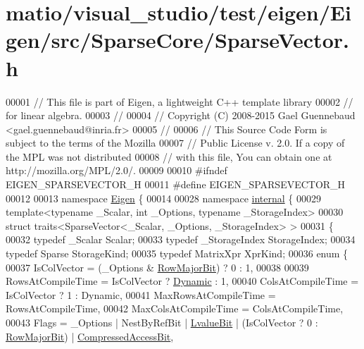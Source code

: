 \hypertarget{matio_2visual__studio_2test_2eigen_2_eigen_2src_2_sparse_core_2_sparse_vector_8h_source}{}\section{matio/visual\+\_\+studio/test/eigen/\+Eigen/src/\+Sparse\+Core/\+Sparse\+Vector.h}
\label{matio_2visual__studio_2test_2eigen_2_eigen_2src_2_sparse_core_2_sparse_vector_8h_source}

\begin{DoxyCode}
00001 \textcolor{comment}{// This file is part of Eigen, a lightweight C++ template library}
00002 \textcolor{comment}{// for linear algebra.}
00003 \textcolor{comment}{//}
00004 \textcolor{comment}{// Copyright (C) 2008-2015 Gael Guennebaud <gael.guennebaud@inria.fr>}
00005 \textcolor{comment}{//}
00006 \textcolor{comment}{// This Source Code Form is subject to the terms of the Mozilla}
00007 \textcolor{comment}{// Public License v. 2.0. If a copy of the MPL was not distributed}
00008 \textcolor{comment}{// with this file, You can obtain one at http://mozilla.org/MPL/2.0/.}
00009 
00010 \textcolor{preprocessor}{#ifndef EIGEN\_SPARSEVECTOR\_H}
00011 \textcolor{preprocessor}{#define EIGEN\_SPARSEVECTOR\_H}
00012 
00013 \textcolor{keyword}{namespace }\hyperlink{namespace_eigen}{Eigen} \{ 
00014 
00028 \textcolor{keyword}{namespace }\hyperlink{namespaceinternal}{internal} \{
00029 \textcolor{keyword}{template}<\textcolor{keyword}{typename} \_Scalar, \textcolor{keywordtype}{int} \_Options, \textcolor{keyword}{typename} \_StorageIndex>
00030 \textcolor{keyword}{struct }traits<SparseVector<\_Scalar, \_Options, \_StorageIndex> >
00031 \{
00032   \textcolor{keyword}{typedef} \_Scalar Scalar;
00033   \textcolor{keyword}{typedef} \_StorageIndex StorageIndex;
00034   \textcolor{keyword}{typedef} Sparse StorageKind;
00035   \textcolor{keyword}{typedef} MatrixXpr XprKind;
00036   \textcolor{keyword}{enum} \{
00037     IsColVector = (\_Options & \hyperlink{group__flags_gae4f56c2a60bbe4bd2e44c5b19cbe8762}{RowMajorBit}) ? 0 : 1,
00038 
00039     RowsAtCompileTime = IsColVector ? \hyperlink{namespace_eigen_ad81fa7195215a0ce30017dfac309f0b2}{Dynamic} : 1,
00040     ColsAtCompileTime = IsColVector ? 1 : Dynamic,
00041     MaxRowsAtCompileTime = RowsAtCompileTime,
00042     MaxColsAtCompileTime = ColsAtCompileTime,
00043     Flags = \_Options | NestByRefBit | \hyperlink{group__flags_gae2c323957f20dfdc6cb8f44428eaec1a}{LvalueBit} | (IsColVector ? 0 : 
      \hyperlink{group__flags_gae4f56c2a60bbe4bd2e44c5b19cbe8762}{RowMajorBit}) | \hyperlink{group__flags_gaed0244284da47a2b8661261431173caf}{CompressedAccessBit},

\end{DoxyCode}
